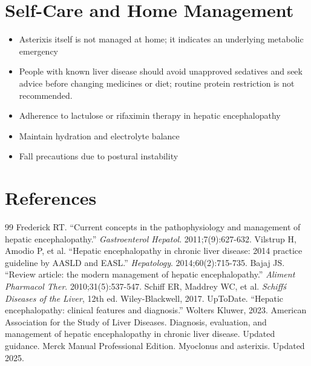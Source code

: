 \section*{Self-Care and Home Management}
\begin{itemize}
 \item Asterixis itself is not managed at home; it indicates an underlying metabolic emergency
 \item People with known liver disease should avoid unapproved sedatives and seek advice before changing medicines or diet; routine protein restriction is not recommended.
 \item Adherence to lactulose or rifaximin therapy in hepatic encephalopathy
 \item Maintain hydration and electrolyte balance
 \item Fall precautions due to postural instability
\end{itemize}

\section*{References}
\begin{thebibliography}{99}
 Frederick RT. ``Current concepts in the pathophysiology and management of hepatic encephalopathy.'' \textit{Gastroenterol Hepatol}. 2011;7(9):627-632.
 Vilstrup H, Amodio P, et al. ``Hepatic encephalopathy in chronic liver disease: 2014 practice guideline by AASLD and EASL.'' \textit{Hepatology}. 2014;60(2):715-735.
 Bajaj JS. ``Review article: the modern management of hepatic encephalopathy.'' \textit{Aliment Pharmacol Ther}. 2010;31(5):537-547.
 Schiff ER, Maddrey WC, et al. \textit{Schiff\'s Diseases of the Liver}, 12th ed. Wiley-Blackwell, 2017.
 UpToDate. ``Hepatic encephalopathy: clinical features and diagnosis.'' Wolters Kluwer, 2023.
 American Association for the Study of Liver Diseases. Diagnosis, evaluation, and management of hepatic encephalopathy in chronic liver disease. Updated guidance.
 Merck Manual Professional Edition. Myoclonus and asterixis. Updated 2025.
\end{thebibliography}
